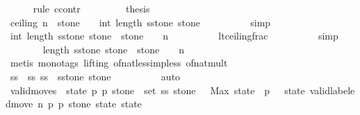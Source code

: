 \begin{isabellebody}
\ \ \ \ \isamarkupfalse%
\ {\isacharparenleft}rule\ ccontr{\isacharparenright}\isanewline
\ \ \ \ \ \ \isamarkupfalse%
\ {\isachardoublequoteopen}{\isasymnot}\ {\isacharquery}thesis{\isachardoublequoteclose}\isanewline
\ \ \ \ \ \ \isamarkupfalse%
\ {\isachardoublequoteopen}ceiling\ {\isacharparenleft}n\ {\isacharslash}\ {\isacharparenleft}stone\ {\isacharplus}\ {}{\isacharparenright}{\isacharparenright}\ {\isachargreater}\ int\ {\isacharparenleft}length\ {\isacharparenleft}{\isacharquery}sstone\ stone{\isacharparenright}{\isacharparenright}{\isachardoublequoteclose}\isanewline
\ \ \ \ \ \ \ \ \isamarkupfalse%
\ simp\isanewline
\ \ \ \ \ \ \isamarkupfalse%
\ {\isachardoublequoteopen}int\ {\isacharparenleft}length\ {\isacharparenleft}{\isacharquery}sstone\ stone{\isacharparenright}{\isacharparenright}\ {\isacharasterisk}\ {\isacharparenleft}stone\ {\isacharplus}\ {}{\isacharparenright}\ {\isacharless}\ n{\isachardoublequoteclose}\isanewline
\ \ \ \ \ \ \ \ \isamarkupfalse%
\ lt{\isacharunderscore}ceiling{\isacharunderscore}frac\isanewline
\ \ \ \ \ \ \ \ \isamarkupfalse%
\ simp\isanewline
\ \ \ \ \ \ \isamarkupfalse%
\ {\isachardoublequoteopen}length\ {\isacharparenleft}{\isacharquery}sstone\ stone{\isacharparenright}\ {\isacharasterisk}\ {\isacharparenleft}stone\ {\isacharplus}\ {}{\isacharparenright}\ {\isacharless}\ n{\isachardoublequoteclose}\isanewline
\ \ \ \ \ \ \ \ \isamarkupfalse%
\ {\isacharparenleft}metis\ {\isacharparenleft}mono{\isacharunderscore}tags{\isacharcomma}\ lifting{\isacharparenright}\ of{\isacharunderscore}nat{\isacharunderscore}less{\isacharunderscore}imp{\isacharunderscore}less\ of{\isacharunderscore}nat{\isacharunderscore}mult{\isacharparenright}\isanewline
\isanewline
\ \ \ \ \ \ \isamarkupfalse%
\ ss\ \ ss{\isacharcolon}\ {\isachardoublequoteopen}ss\ {\isacharequal}\ {\isacharquery}sstone\ stone{\isachardoublequoteclose}\isanewline
\ \ \ \ \ \ \ \ \isamarkupfalse%
\ auto\isanewline
\isanewline
\ \ \ \ \ \ \isamarkupfalse%
\ valid{\isacharunderscore}moves{\isacharprime}{\isacharcolon}\ {\isachardoublequoteopen}{\isasymforall}\ {\isacharparenleft}state{\isacharcomma}\ p{}{\isacharcomma}\ p{}{\isacharcomma}\ stone{\isacharprime}{\isacharparenright}\ {\isasymin}\ set\ ss{\isachardot}\ stone{\isacharprime}\ {\isacharequal}\ \ Max\ {\isacharparenleft}state\ {\isacharbang}\ p{}{\isacharparenright}\ {\isasymand}\ {\isacharparenleft}{\isasymexists}\ state{\isacharprime}{\isachardot}\ valid{\isacharunderscore}labeled{\isacharunderscore}move{\isacharprime}\ n\ p{}\ p{}\ stone{\isacharprime}\ state\ state{\isacharprime}{\isacharparenright}{\isachardoublequoteclose}\isanewline

\end{isabellebody}
